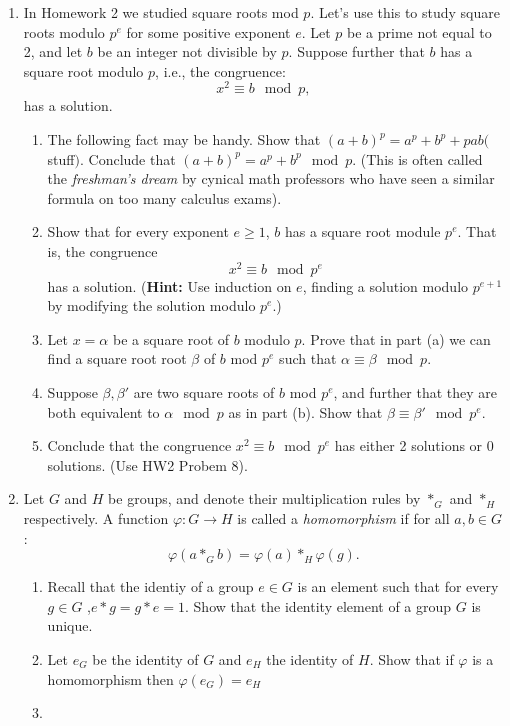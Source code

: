 \documentclass[11pt]{article}
\begin{document}
\begin{enumerate}
{  }
  \item{
  In Homework 2 we studied square roots mod $p$.  Let's use this to study square roots modulo $p^e$ for some positive exponent $e$.  Let $p$ be a prime not equal to 2, and let $b$ be an integer not divisible by $p$.  Suppose further that $b$ has a square root modulo $p$, i.e., the congruence:
  \[x^2\equiv b\mod p,\]
  has a solution.
  \begin{enumerate}
    \item{The following fact may be handy.  Show that $(a+b)^p = a^p + b^p + pab($stuff$)$.  Conclude that  $(a+b)^p = a^p+b^p\mod p$.  (This is often called the \textit{freshman's dream} by cynical math professors who have seen a similar formula on too many calculus exams).
    }
    \item{
    Show that for every exponent $e\ge 1$, $b$ has a square root module $p^e$.  That is, the congruence
    \[x^2\equiv b\mod p^e\]
    has a solution.  (\textbf{Hint:} Use induction on $e$, finding a solution modulo $p^{e+1}$ by modifying the solution modulo $p^e$.)
    }
    \item{
    Let $x=\alpha$ be a square root of $b$ modulo $p$.  Prove that in part (a) we can find a square root root $\beta$ of $b$ mod $p^e$ such that $\alpha\equiv\beta\mod p$.
    }
    \item{
    Suppose $\beta,\beta'$ are two square roots of $b$ mod $p^e$, and further that they are both equivalent to $\alpha\mod p$ as in part (b).  Show that $\beta\equiv\beta'\mod p^e$.
    }
    \item{
    Conclude that the congruence $x^2\equiv b\mod p^e$ has either 2 solutions or 0 solutions.  (Use HW2 Probem 8).
    }
  \end{enumerate}
  }
  \item{
  Let $G$ and $H$ be groups, and denote their multiplication rules by $*_G$ and $*_H$ respectively.  A function $\varphi:G\to H$ is called a \textit{homomorphism} if for all $a,b\in G$:
  \[\varphi(a*_G b) = \varphi(a)*_H\varphi(g).\]
  \begin{enumerate}
    \item{
    Recall that the identiy of a group $e\in G$ is an element such that for every $g\in G$ ,$e*g=g*e=1$.  Show that the identity element of a group $G$ is unique.
    }
    \item{
    Let $e_G$ be the identity of $G$ and $e_H$ the identity of $H$.  Show that if $\varphi$ is a homomorphism then $\varphi(e_G) = e_H$
    }
    \item{
}
\end{enumerate}}
\end{enumerate}
\end{document}
